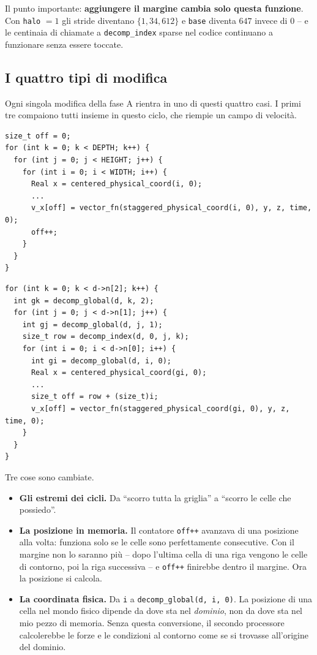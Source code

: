 \documentclass[11pt,a4paper]{article}
\newcommand{\cd}[1]{\texttt{\small #1}}
\newcommand{\etichetta}[1]{\par\smallskip\noindent{\small\bfseries\color{scuro}#1}\par\vspace{-4pt}}
\begin{document}
Il punto importante: \textbf{aggiungere il margine cambia solo questa
funzione}. Con \cd{halo} $=1$ gli stride diventano $\{1,34,612\}$ e \cd{base}
diventa $647$ invece di $0$ -- e le centinaia di chiamate a \cd{decomp\_index}
sparse nel codice continuano a funzionare senza essere toccate.

\subsection*{I quattro tipi di modifica}

Ogni singola modifica della fase A rientra in uno di questi quattro casi. I
primi tre compaiono tutti insieme in questo ciclo, che riempie un campo di
velocità.

\etichetta{Prima}
\begin{lstlisting}
size_t off = 0;
for (int k = 0; k < DEPTH; k++) {
  for (int j = 0; j < HEIGHT; j++) {
    for (int i = 0; i < WIDTH; i++) {
      Real x = centered_physical_coord(i, 0);
      ...
      v_x[off] = vector_fn(staggered_physical_coord(i, 0), y, z, time, 0);
      off++;
    }
  }
}
\end{lstlisting}

\etichetta{Dopo}
\begin{lstlisting}
for (int k = 0; k < d->n[2]; k++) {
  int gk = decomp_global(d, k, 2);
  for (int j = 0; j < d->n[1]; j++) {
    int gj = decomp_global(d, j, 1);
    size_t row = decomp_index(d, 0, j, k);
    for (int i = 0; i < d->n[0]; i++) {
      int gi = decomp_global(d, i, 0);
      Real x = centered_physical_coord(gi, 0);
      ...
      size_t off = row + (size_t)i;
      v_x[off] = vector_fn(staggered_physical_coord(gi, 0), y, z, time, 0);
    }
  }
}
\end{lstlisting}

Tre cose sono cambiate.

\begin{itemize}
\item \textbf{Gli estremi dei cicli.} Da ``scorro tutta la griglia'' a ``scorro
le celle che possiedo''.
\item \textbf{La posizione in memoria.} Il contatore \cd{off++} avanzava di una
posizione alla volta: funziona solo se le celle sono perfettamente consecutive.
Con il margine non lo saranno più -- dopo l'ultima cella di una riga vengono le
celle di contorno, poi la riga successiva -- e \cd{off++} finirebbe dentro il
margine. Ora la posizione si calcola.
\item \textbf{La coordinata fisica.} Da \cd{i} a \cd{decomp\_global(d, i, 0)}.
La posizione di una cella nel mondo fisico dipende da dove sta nel
\emph{dominio}, non da dove sta nel mio pezzo di memoria. Senza questa
conversione, il secondo processore calcolerebbe le forze e le condizioni al
contorno come se si trovasse all'origine del dominio.
\end{itemize}
\end{document}
